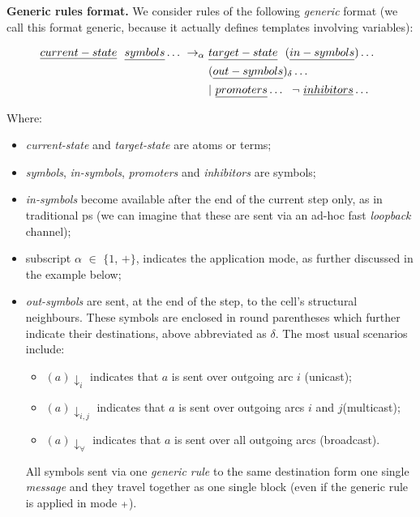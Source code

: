 \noindent
\textbf{Generic rules format.}
We consider rules of the following \emph{generic} format 
(we call this format generic, because it actually defines templates involving variables):
\begin{framed}
\vspace{-0.6cm}
\begin{align*}
\emph{current-state} ~~ \emph{symbols} \dots ~ \rightarrow_\alpha ~ & \emph{target-state} ~~ (\emph{in-symbols}) \dots ~~ \\
 & (\emph{out-symbols})_\delta \dots \\
 & | ~  \emph{promoters} \dots ~~ \neg ~  \emph{inhibitors} \dots
\end{align*}
\vspace{-0.8cm}
\end{framed}
Where:
\begin{itemize}
\item \emph{current-state} and \emph{target-state} are atoms or terms;

\smallskip
\item \emph{symbols}, \emph{in-symbols}, \emph{promoters} and \emph{inhibitors} are symbols;

\smallskip
\item \emph{in-symbols} become available after the end of the current step only, as in traditional \gls{ps}  (we can imagine that these are sent via an ad-hoc fast \emph{loopback} channel); 

\smallskip
\item subscript $\alpha$ $\in$ $\{1$, $+\}$, 
indicates the application mode,
as further discussed in the example below;

\smallskip
\item \emph{out-symbols} are sent, at the end of the step, to the cell's structural neighbours.
These symbols are enclosed in round parentheses which further indicate 
their destinations, above abbreviated as $\delta$. 
The most usual scenarios include: 

\begin{itemize}
\item $(a)\downarrow_i$ indicates that $a$ is sent over outgoing arc $i$ (unicast); 

\item $(a)\downarrow_{i,j}$ indicates that $a$ is sent over outgoing arcs $i$ and $j$(multicast); 

\item $(a)\downarrow_\forall$ indicates that $a$ is sent over all outgoing arcs (broadcast). 
\end{itemize}

All symbols sent via one \emph{generic rule} to the same destination form one single \emph{message} and they travel together as one single block (even if the generic rule is applied in mode $\scriptstyle + \displaystyle$).
\end{itemize}

